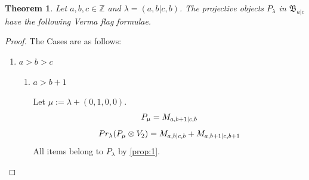 \documentclass[12pt,a4paper]{article}
\newtheorem{theorem}{Theorem}[section]
\begin{document}
\begin{theorem}
  Let $a,b,c \in \mathbb{Z}$ and $\lambda = (a,b|c,b)$. The projective objects $P_{\lambda}$ in $\mathfrak{B}_{a|c}$ have the following Verma flag formulae.
\end{theorem}
\begin{proof} The Cases are as follows:\par
\begin{enumerate}
  \item $a>b>c$
    \begin{enumerate}
      \item $a>b+1$ \par
      Let $\mu:=\lambda + (0,1,0,0) $. 
\begin{equation}\notag
  \begin{aligned}
      P_{\mu} = M_{a,b+1|c,b}
  \end{aligned}
\end{equation}
\begin{equation}\notag
  \begin{aligned}
    Pr_{\lambda}(P_\mu \otimes V_2) =
M_{a,b|c,b}
+M_{a,b+1|c,b+1}
  \end{aligned}
\end{equation}
All items belong to $P_\lambda$ by \cref{prop:1}.
    \end{enumerate}
\end{enumerate}
\end{proof}
\end{document}
